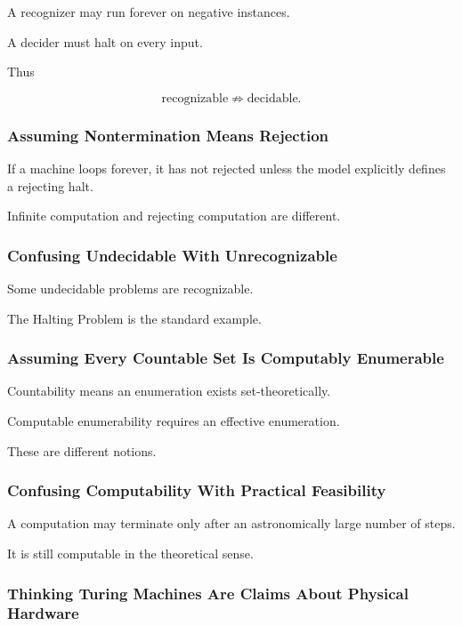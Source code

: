 A recognizer may run forever on negative instances.

A decider must halt on every input.

Thus

\[
\boxed{
\text{recognizable}
\not\Rightarrow
\text{decidable}.
}
\]

\subsubsection{Assuming Nontermination Means Rejection}

If a machine loops forever, it has not rejected unless the model explicitly
defines a rejecting halt.

Infinite computation and rejecting computation are different.

\subsubsection{Confusing Undecidable With Unrecognizable}

Some undecidable problems are recognizable.

The Halting Problem is the standard example.

\subsubsection{Assuming Every Countable Set Is Computably Enumerable}

Countability means an enumeration exists set-theoretically.

Computable enumerability requires an effective enumeration.

These are different notions.

\subsubsection{Confusing Computability With Practical Feasibility}

A computation may terminate only after an astronomically large number of
steps.

It is still computable in the theoretical sense.

\subsubsection{Thinking Turing Machines Are Claims About Physical Hardware}

